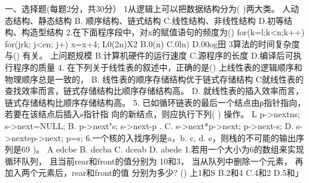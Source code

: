 

一、选择题(每题2分，共30分）
1从逻辑上可以把数据结构分为( )两大类。
人动态结构、静态结构
B. 顺序结构、链式结构
C.线性结构、非线性结构
D.初等结构、构造型结构
2.在下面程序段中，对x的赋值语句的频度为()
for(k=l;k<n;k++)
for(jrk; j<en; j+)
x=x+4;
L0(2n)X2
B.0(n)
C.0ln)
D.00og田
3算法的时间复杂度与() 有关。
上问题规模
B.计算机硬件的运行速度
C.源程序的长度
D.编译后可执行程序的质量
4. 在下列关于线性表的叙述中，正确的是()
上线性表的逻辑顺序和物理顺序总是一致的，
B. 线性表的顺序存储结构优于链式存储结构
C就线性表的查找效率而言，链式存储结构比顺序存储结构高。
D. 就线性表的插入效率而言，链式存储结构比顺序存储结构高。
5. 已如循环链表的最后一个结点由ρ指针指向，若要在该结点后插入s指针指
向的新结点，则应执行下列( ) 操作。
L p->nextns; s->next=NULL;
B. p->next"s; s->next-p .
C. s->next*p->next; p->next-s;
D. s->nextep->next; p=s;
6.一个核的入找序列是a，b. c, d. e，则栈的不可能的输出序列是69 )。
A edcbe
B. decba
C. dceab
D. abede
1.若用一个大小为6的数组来实现循环队列， 且当前rear和front的值分别为
10和3， 当从队列中删除一个元素， 再加入两个元素后，rear和front的值
分别为多少? ()
上1和S
B.2和4
C.4和2
D.5和」
